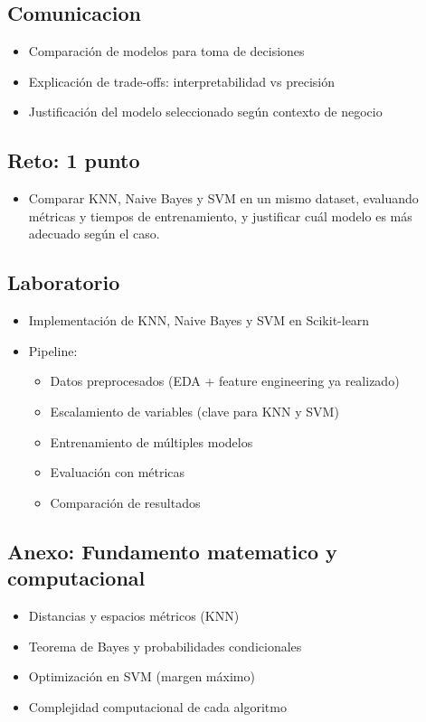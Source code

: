 \documentclass[12pt,a4paper,openany,oneside]{book}
\begin{document}
\begin{itemize}
\subsection{Comunicacion}
\begin{itemize}
    \item Comparación de modelos para toma de decisiones
    \item Explicación de trade-offs: interpretabilidad vs precisión
    \item Justificación del modelo seleccionado según contexto de negocio
\end{itemize}

\subsection{Reto: 1 punto}
\begin{itemize}
    \item Comparar KNN, Naive Bayes y SVM en un mismo dataset, evaluando métricas y tiempos de entrenamiento, y justificar cuál modelo es más adecuado según el caso.
\end{itemize}

\subsection{Laboratorio}
\begin{itemize}
    \item Implementación de KNN, Naive Bayes y SVM en Scikit-learn
    \item Pipeline:
    \begin{itemize}
        \item Datos preprocesados (EDA + feature engineering ya realizado)
        \item Escalamiento de variables (clave para KNN y SVM)
        \item Entrenamiento de múltiples modelos
        \item Evaluación con métricas
        \item Comparación de resultados
    \end{itemize}
\end{itemize}

\subsection{Anexo: Fundamento matematico y computacional}
\begin{itemize}
    \item Distancias y espacios métricos (KNN)
    \item Teorema de Bayes y probabilidades condicionales
    \item Optimización en SVM (margen máximo)
    \item Complejidad computacional de cada algoritmo
\end{itemize}


\end{itemize}
\end{document}
